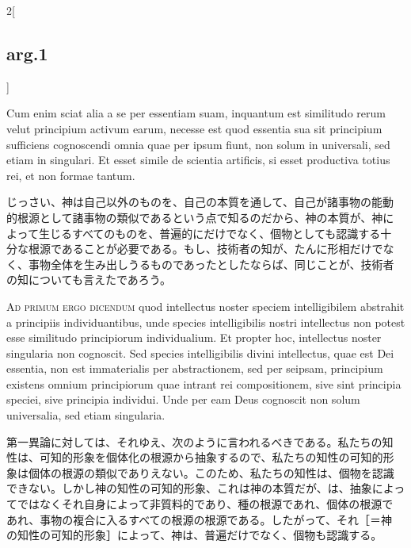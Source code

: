 \documentclass[paper=a4paper,fontsize=10pt,jafontsize=9pt,titlepage]{jlreq}
\begin{document}
\begin{paracol}{2}[\subsection{arg.1}]
\switchcolumn*

Cum enim sciat alia a se per essentiam suam, inquantum est similitudo
rerum velut principium activum earum, necesse est quod essentia sua
sit principium sufficiens cognoscendi omnia quae per ipsum fiunt, non
solum in universali, sed etiam in singulari. Et esset simile de
scientia artificis, si esset productiva totius rei, et non formae
tantum.

\switchcolumn

じっさい、神は自己以外のものを、自己の本質を通して、自己が諸事物の能動
的根源として諸事物の類似であるという点で知るのだから、神の本質が、神に
よって生じるすべてのものを、普遍的にだけでなく、個物としても認識する十
分な根源であることが必要である。もし、技術者の知が、たんに形相だけでな
く、事物全体を生み出しうるものであったとしたならば、同じことが、技術者
の知についても言えたであろう。

\switchcolumn*[\subsection{ad.1}]

{\scshape Ad primum ergo dicendum} quod intellectus noster speciem
intelligibilem abstrahit a principiis individuantibus, unde species
intelligibilis nostri intellectus non potest esse similitudo
principiorum individualium. Et propter hoc, intellectus noster
singularia non cognoscit. Sed species intelligibilis divini
intellectus, quae est Dei essentia, non est immaterialis per
abstractionem, sed per seipsam, principium existens omnium
principiorum quae intrant rei compositionem, sive sint principia
speciei, sive principia individui. Unde per eam Deus cognoscit non
solum universalia, sed etiam singularia.

\switchcolumn

第一異論に対しては、それゆえ、次のように言われるべきである。私たちの知
性は、可知的形象を個体化の根源から抽象するので、私たちの知性の可知的形
象は個体の根源の類似でありえない。このため、私たちの知性は、個物を認識
できない。しかし神の知性の可知的形象、これは神の本質だが、は、抽象によっ
てではなくそれ自身によって非質料的であり、種の根源であれ、個体の根源で
あれ、事物の複合に入るすべての根源の根源である。したがって、それ［＝神
の知性の可知的形象］によって、神は、普遍だけでなく、個物も認識する。

\switchcolumn*[\subsection{ad.2}]


\end{paracol}
\end{document}
